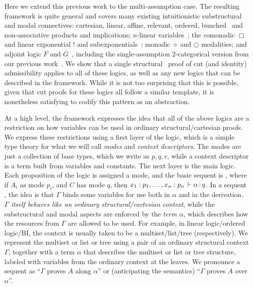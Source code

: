 Here we extend this previous work to the multi-assumption case.  The
resulting framework is quite general and covers many existing
intuitionistic substructural and modal connectives: cartesian, linear,
affine, relevant, ordered, bunched~\citep{ohearnpymXXBI} and
non-associative products and implications; $n$-linear
variables~\citep{jcreedXXnames}; the comonadic $\Box$ and linear
exponential $!$ and subexponentials~\citep{danos,nigman}; monadic
$\diamond$ and $\bigcirc$ modalities; and adjoint logic $F$ and
$G$~\citep{bentonwadler96adjoint,reed09adjoint}, including the
single-assumption 2-categorical version from our previous
work~\citep{ls16adjoint}.  We show that a single
structural~\citep{pfenning94cut} proof of cut (and identity)
admissibility applies to all of these logics, as well as any new logics
that can be described in the framework.  While it is not too surprising
that this is possible, given that cut proofs for these logics all follow
a similar template, it is nonetheless satisfying to codify this pattern
as an abstraction.

At a high level, the framework expresses the idea that all of the above
logics are a restriction on how variables can be used in ordinary
structural/cartesian proofs.  We express these restrictions using a
first layer of the logic, which is a simple type theory for what we will
call \emph{modes} and \emph{context descriptors}.  The modes are just a
collection of base types, which we write as $p,q,r$, while a context
descriptor is a term built from variables and constants.  The next layer
is the main logic.  Each proposition of the logic is assigned a mode,
and the basic sequent is ,
where if $A_i$ as mode $p_i$, and $C$ has mode $q$, then $x_1 :
  p_1,\ldots, x_n : p_n \, \vdash \alpha \, \mathit{:} \, q$.  In a sequent
, the idea is that $\Gamma$ binds some variables
for use both in $\alpha$ and in the derivation.  \emph{$\Gamma$ itself
  behaves like an ordinary structural/cartesian context}, while the
substructural and modal aspects are enforced by the \emph{term}
$\alpha$, which describes how the resources from $\Gamma$ are allowed to
be used.  For example, in linear logic/ordered logic/BI, the context is
usually taken to be a multiset/list/tree (respectively).  We represent
the multiset or list or tree using a pair of an ordinary structural
context $\Gamma$, together with a term $\alpha$ that describes the
multiset or list or tree structure, labeled with variables from the
ordinary context at the leaves.  We pronounce a sequent
 as ``$\Gamma$ proves $A$ along $\alpha$'' or
(anticipating the semantics) ``$\Gamma$ proves $A$ over $\alpha$''.

